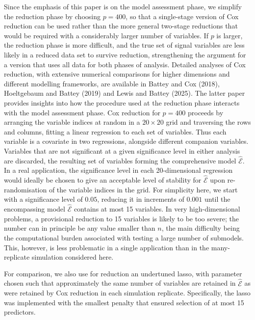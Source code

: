 \documentclass[10pt, reqno]{amsart}
\numberwithin{equation}{section}
\begin{document}
Since the emphasis of this paper is on the model assessment phase, we simplify the reduction phase by choosing $p=400$, so that a single-stage version of Cox reduction can be used rather than the more general two-stage reductions that would be required with a considerably larger number of variables. If $p$ is larger, the reduction phase is more difficult, and the true set of signal variables are less likely in a reduced data set to survive reduction, strengthening the argument for a version that uses all data for both phases of analysis. Detailed analyses of Cox reduction, with extensive numerical comparisons for higher dimensions and different modelling frameworks, are available in Battey and Cox (2018), Hoeltgebaum and Battey (2019) and Lewis and Battey (2025). The latter paper provides insights into how the procedure used at the reduction phase interacts with the model assessment phase. Cox reduction for $p=400$ proceeds by arranging the variable indices at random in a $20\times 20$ grid and traversing the rows and columns, fitting a linear regression to each set of variables. Thus each variable is a covariate in two regressions, alongside different companion variables. Variables that are not significant at a given significance level in either analysis are discarded, the resulting set of variables forming the comprehensive model $\hat{\mathcal{E}}$. In a real application, the significance level in each 20-dimensional regression would ideally be chosen to give an acceptable level of stability for $\hat{\mathcal{E}}$ upon re-randomisation of the variable indices in the grid. For simplicity here, we start with a significance level of $0.05$, reducing it in increments of $0.001$ until the encompassing model $\hat{\mathcal{E}}$ contains at most 15 variables. In very high-dimensional problems, a provisional reduction to 15 variables is likely to be too severe; the number can in principle be any value smaller than $n$, the main difficulty being the computational burden associated with testing a large number of submodels. This, however, is less problematic in a single application than in the many-replicate simulation considered here.

For comparison, we also use for reduction an undertuned lasso, with parameter chosen such that approximately the same number of variables are retained in $\hat{\mathcal{E}}$ as were retained by Cox reduction in each simulation replicate. Specifically, the lasso was implemented with the smallest penalty that ensured selection of at most 15 predictors.
\end{document}
